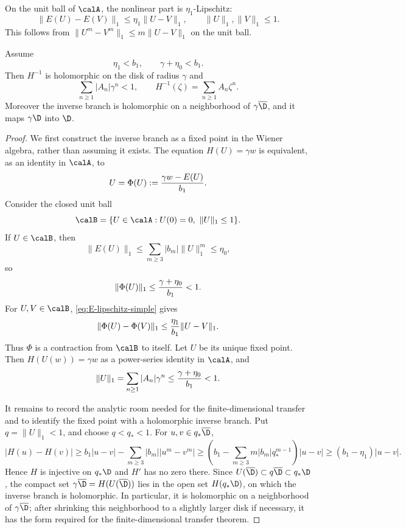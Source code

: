 On the unit ball of $\calA$, the nonlinear part is $\eta_1$-Lipschitz:
\begin{equation}\label{eq:E-lipschitz-simple}
  \|E(U)-E(V)\|_1\le \eta_1\|U-V\|_1,
  \qquad \|U\|_1,\|V\|_1\le1.
\end{equation}
This follows from $\|U^m-V^m\|_1\le m\|U-V\|_1$ on the unit ball.

\begin{theorem}\label{thm:simple-wiener}
Assume
\begin{equation}\label{eq:simple-wiener-cond}
  \eta_1<b_1,
  \qquad
  \gamma+\eta_0<b_1.
\end{equation}
Then $H^{-1}$ is holomorphic on the disk of radius $\gamma$ and
\[
  \sum_{n\ge1}|A_n|\gamma^n<1,
  \qquad H^{-1}(\zeta)=\sum_{n\ge1}A_n\zeta^n.
\]
Moreover the inverse branch is holomorphic on a neighborhood of $\gamma\overline\D$, and it maps $\gamma\D$ into $\D$.
\end{theorem}

\begin{proof}
We first construct the inverse branch as a fixed point in the Wiener algebra, rather than assuming it exists.  The equation $H(U)=\gamma w$ is equivalent, as an identity in $\calA$, to
\[
  U=\Phi(U):={\gamma w-E(U)\over b_1}.
\]
Consider the closed unit ball
\[
  \calB=\{U\in\calA: U(0)=0,\ \|U\|_1\le1\}.
\]
If $U\in\calB$, then
\[
  \|E(U)\|_1\le\sum_{m\ge3}|b_m|\|U\|_1^m\le\eta_0,
\]
so
\[
  \|\Phi(U)\|_1\le{\gamma+\eta_0\over b_1}<1.
\]
For $U,V\in\calB$, \eqref{eq:E-lipschitz-simple} gives
\[
  \|\Phi(U)-\Phi(V)\|_1\le{\eta_1\over b_1}\|U-V\|_1.
\]
Thus $\Phi$ is a contraction from $\calB$ to itself.  Let $U$ be its unique fixed point.  Then $H(U(w))=\gamma w$ as a power-series identity in $\calA$, and
\[
  \|U\|_1=\sum_{n\ge1}|A_n|\gamma^n\le {\gamma+\eta_0\over b_1}<1.
\]

It remains to record the analytic room needed for the finite-dimensional transfer and to identify the fixed point with a holomorphic inverse branch.  Put $q=\|U\|_1<1$, and choose $q<q_*<1$.  For $u,v\in q_*\overline\D$,
\[
  |H(u)-H(v)|\ge b_1|u-v|-\sum_{m\ge3}|b_m||u^m-v^m|
  \ge \left(b_1-\sum_{m\ge3}m|b_m|q_*^{m-1}\right)|u-v|
  \ge (b_1-\eta_1)|u-v|.
\]
Hence $H$ is injective on $q_*\D$ and $H'$ has no zero there.  Since $U(\overline\D)\subset q\overline\D\subset q_*\D$, the compact set $\gamma\overline\D=H(U(\overline\D))$ lies in the open set $H(q_*\D)$, on which the inverse branch is holomorphic.  In particular, it is holomorphic on a neighborhood of $\gamma\overline\D$; after shrinking this neighborhood to a slightly larger disk if necessary, it has the form required for the finite-dimensional transfer theorem.
\end{proof}



